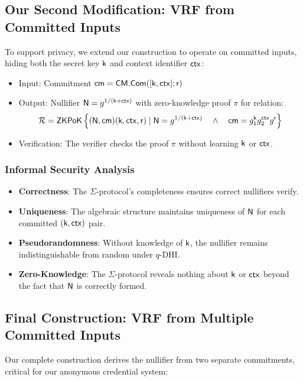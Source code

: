 \subsection{Our Second Modification: VRF from Committed Inputs}
To support privacy, we extend our construction to operate on committed inputs, hiding both the secret key $\mathsf{k}$ and context identifier $\mathsf{ctx}$:

\begin{itemize}
    \item Input: Commitment $\mathsf{cm} = \mathsf{CM.Com}([\mathsf{k}, \mathsf{ctx}]; \mathsf{r})$
    \item Output: Nullifier $\mathsf{N} = g^{1/(\mathsf{k} + \mathsf{ctx})}$ with zero-knowledge proof $\pi$ for relation:
    \[
    \mathcal{R} = {\mathsf{ZKPoK}} \left\{ (\mathsf{N}, \mathsf{cm})(\mathsf{k}, \mathsf{ctx}, \mathsf{r}) \mid \mathsf{N} = g^{1/(\mathsf{k} + \mathsf{ctx})} \quad \wedge \quad \mathsf{cm} = g_1^{\mathsf{k}} g_2^{\mathsf{ctx}}g^{\mathsf{r}}  \right\}
    \]
    \item Verification: The verifier checks the proof $\pi$ without learning $\mathsf{k}$ or $\mathsf{ctx}$.
\end{itemize}

\subsubsection{Informal Security Analysis}
\begin{itemize}
    \item \textbf{Correctness}: The $\Sigma$-protocol's completeness ensures correct nullifiers verify.
    \item \textbf{Uniqueness}: The algebraic structure maintains uniqueness of $\mathsf{N}$ for each committed $(\mathsf{k},\mathsf{ctx})$ pair.
    \item \textbf{Pseudorandomness}: Without knowledge of $\mathsf{k}$, the nullifier remains indistinguishable from random under $q$-DHI.
    \item \textbf{Zero-Knowledge}: The $\Sigma$-protocol reveals nothing about $\mathsf{k}$ or $\mathsf{ctx}$ beyond the fact that $\mathsf{N}$ is correctly formed.
\end{itemize}

\subsection{Final Construction: VRF from Multiple Committed Inputs}
Our complete construction derives the nullifier from two separate commitments, critical for our anonymous credential system:

